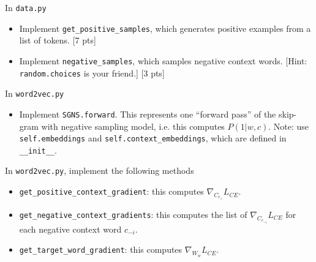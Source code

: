 \documentclass[11pt]{article}
\begin{document}
\vspace{2em}
 In \texttt{data.py}
\begin{itemize}
  \item Implement \texttt{get\_positive\_samples}, which generates positive examples from a list of tokens. [7 pts]
  \item Implement \texttt{negative\_samples}, which samples negative context words.  [Hint: \texttt{random.choices} is your friend.] [3 pts]
\end{itemize}

\vspace{2em}
 In \texttt{word2vec.py}
\begin{itemize}
  \item Implement \texttt{SGNS.forward}.  This represents one ``forward pass'' of the skip-gram with negative sampling model, i.e. this computes $P(1 | w, c)$.  Note: use \texttt{self.embeddings} and \texttt{self.context\_embeddings}, which are defined in \texttt{\_\_init\_\_}.
\end{itemize}

\vspace{2em}
 In \texttt{word2vec.py}, implement the following methods
\begin{itemize}
  \item \texttt{get\_positive\_context\_gradient}: this computes $\nabla_{C_{c_+}} L_{CE}$.
  \item \texttt{get\_negative\_context\_gradients}: this computes the list of $\nabla_{C_{c_{-i}}} L_{CE}$ for each negative context word $c_{-i}$.
  \item \texttt{get\_target\_word\_gradient}: this computes $\nabla_{W_w} L_{CE}$.
\end{itemize}
\end{document}
